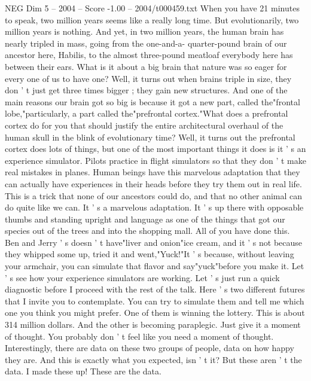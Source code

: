 \begin{textsample}{NEG Dim 5 – 2004 – Score -1.00 – 2004/t000459.txt}  \label{ex:f5_neg_064}
When you have 21 minutes to speak, two million years seems like a really long time.
But evolutionarily, two million years is nothing.
And yet, in two million years, the human brain has nearly tripled in mass, going from the one-and-a- quarter-pound brain of our ancestor here, Habilis, to the almost three-pound meatloaf everybody here has between their ears.
What is it about a big brain that nature was so eager for every one of us to have one?
Well, it turns out when brains triple in size, they don ' t just get three times bigger ; they gain new structures.
And one of the main reasons our brain got so big is because it got a new part, called the"frontal lobe,"particularly, a part called the"prefrontal cortex."What does a prefrontal cortex do for you that should justify the entire architectural overhaul of the human skull in the blink of evolutionary time?
Well, it turns out the prefrontal cortex does lots of things, but one of the most important things it does is it ' s an experience simulator.
Pilots practice in flight simulators so that they don ' t make real mistakes in planes.
Human beings have this marvelous adaptation that they can actually have experiences in their heads before they try them out in real life.
This is a trick that none of our ancestors could do, and that no other animal can do quite like we can.
It ' s a marvelous adaptation.
It ' s up there with opposable thumbs and standing upright and language as one of the things that got our species out of the trees and into the shopping mall.
All of you have done this.
Ben and Jerry ' s doesn ' t have"liver and onion"ice cream, and it ' s not because they whipped some up, tried it and went,"Yuck!"It ' s because, without leaving your armchair, you can simulate that flavor and say"yuck"before you make it.
Let ' s see how your experience simulators are working.
Let ' s just run a quick diagnostic before I proceed with the rest of the talk.
Here ' s two different futures that I invite you to contemplate.
You can try to simulate them and tell me which one you think you might prefer.
One of them is winning the lottery.
This is about 314 million dollars.
And the other is becoming paraplegic.
Just give it a moment of thought.
You probably don ' t feel like you need a moment of thought.
Interestingly, there are data on these two groups of people, data on how happy they are.
And this is exactly what you expected, isn ' t it?
But these aren ' t the data.
I made these up!
These are the data.

\end{textsample}
